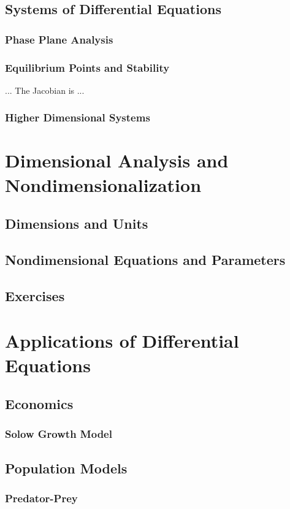\documentclass{book}
\begin{document}
\section{Systems of Differential Equations}
\subsection{Phase Plane Analysis}
\subsection{Equilibrium Points and Stability}
... The Jacobian is ...
\subsection{Higher Dimensional Systems}
%
\chapter[Dimensional Analysis]{Dimensional Analysis and Nondimensionalization}
\section{Dimensions and Units}
\section{Nondimensional Equations and Parameters}
\section{Exercises}
%
\chapter{Applications of Differential Equations}
\section{Economics}
\subsection{Solow Growth Model}
\section{Population Models}
\subsection{Predator-Prey}
\end{document}
